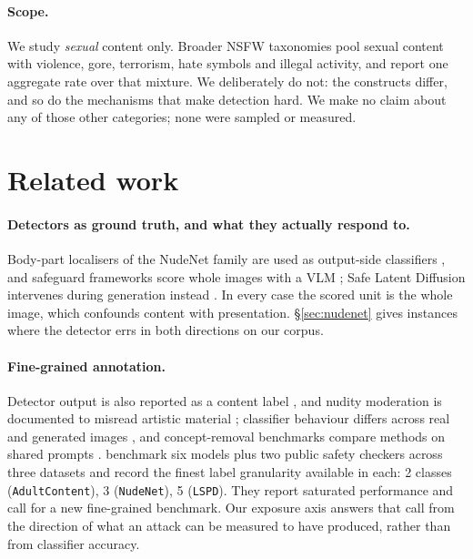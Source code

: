 \documentclass[11pt]{article}
\begin{document}
\paragraph{Scope.}
We study \emph{sexual} content only. Broader NSFW taxonomies pool sexual
content with violence, gore, terrorism, hate symbols and illegal activity, and
report one aggregate rate over that mixture. We deliberately do not: the
constructs differ, and so do the mechanisms that make detection hard. We make
no claim about any of those other categories; none were sampled or measured.

\section{Related work}
\label{sec:related}

\paragraph{Detectors as ground truth, and what they actually respond to.}
Body-part localisers of the NudeNet family are used as output-side classifiers
\citep[Table~1]{crack}, and safeguard frameworks score whole images with a VLM
\citep{llavaguard,shieldgemma2}; Safe Latent Diffusion intervenes during
generation instead \citep{sld}. In every case the scored unit is the whole
image, which confounds content with presentation. \S\ref{sec:nudenet} gives
instances where the detector errs in both directions on our corpus.

\paragraph{Fine-grained annotation.} Detector output is also reported as a
content label \citep{nudenet,safesearch}, and nudity moderation is documented
to misread artistic material \citep{artcentric}; classifier behaviour differs
across real and generated images \citep{unsafebench}, and concept-removal
benchmarks compare methods on shared prompts \citep{sixcd}. \citet{nuditysota}
benchmark six models plus two public safety checkers across three datasets and
record the finest label granularity available in each: 2 classes
(\texttt{AdultContent}), 3 (\texttt{NudeNet}), 5 (\texttt{LSPD}). They report
saturated performance and call for a new fine-grained benchmark. Our exposure
axis answers that call from the direction of what an attack can be measured to
have produced, rather than from classifier accuracy.
\end{document}
